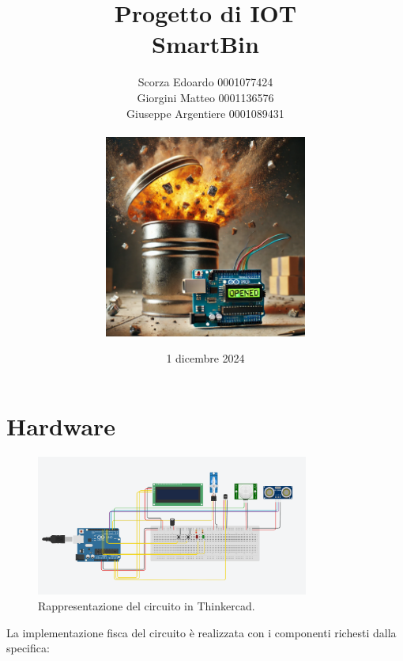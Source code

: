 \documentclass[a4paper,12pt]{report}
\title{Progetto di IOT
    \\ SmartBin}
\author{Scorza Edoardo 0001077424 \\ Giorgini Matteo 0001136576 \\ Giuseppe Argentiere 0001089431 \\\\
\includegraphics[width=0.5\textwidth]{images/cover.png} }
\date{1 dicembre 2024}
\begin{document}
\maketitle
\tableofcontents
\chapter{Hardware}
\begin{figure}[H] %
    \centering
    \includegraphics[width=0.8\textwidth]{images/circuito.png} %
    \caption{Rappresentazione del circuito in Thinkercad.}
    \label{fig:sample-image} %
\end{figure}
\vspace{1cm}
La implementazione fisca del circuito è realizzata con i componenti 
richesti dalla specifica:
\end{document}
